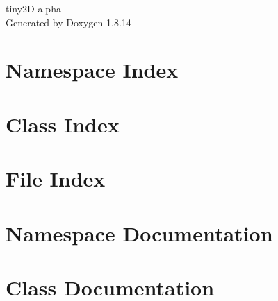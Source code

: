\documentclass[twoside]{book}
\newcommand{\+}{\discretionary{\mbox{\scriptsize$\hookleftarrow$}}{}{}}
\newcommand{\clearemptydoublepage}{%
  \newpage{\pagestyle{empty}\cleardoublepage}%
}
\begin{document}
\hypersetup{pageanchor=false,
             bookmarksnumbered=true,
             pdfencoding=unicode
            }
\begin{titlepage}
\vspace*{7cm}
\begin{center}%
{\Large tiny2D alpha }\\
\vspace*{1cm}
{\large Generated by Doxygen 1.8.14}\\
\end{center}
\end{titlepage}
\clearemptydoublepage
{}
\tableofcontents
\clearemptydoublepage
{}
\hypersetup{pageanchor=true}

\chapter{Namespace Index}

\chapter{Class Index}

\chapter{File Index}

\chapter{Namespace Documentation}


























\chapter{Class Documentation}




















\end{document}
